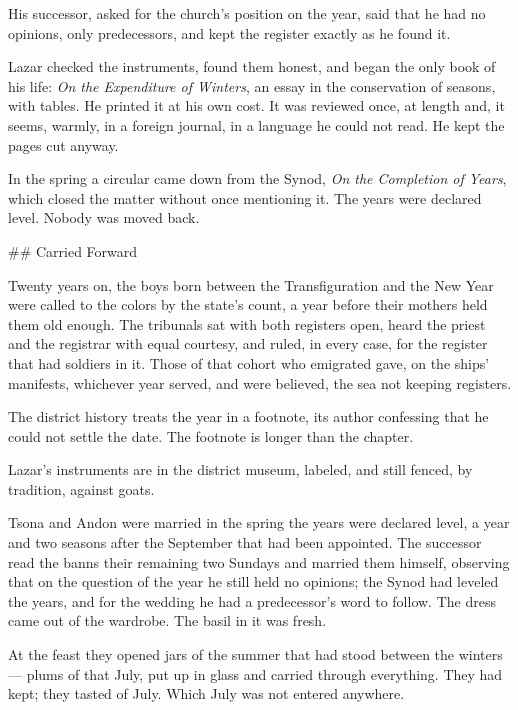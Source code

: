 \documentclass[11pt]{article}
\begin{document}
His successor, asked for the church's position on the year, said that he had no opinions, only predecessors, and kept the register exactly as he found it.

Lazar checked the instruments, found them honest, and began the only book of his life: \emph{On the Expenditure of Winters}, an essay in the conservation of seasons, with tables. He printed it at his own cost. It was reviewed once, at length and, it seems, warmly, in a foreign journal, in a language he could not read. He kept the pages cut anyway.

In the spring a circular came down from the Synod, \emph{On the Completion of Years}, which closed the matter without once mentioning it. The years were declared level. Nobody was moved back.

\#\# Carried Forward

Twenty years on, the boys born between the Transfiguration and the New Year were called to the colors by the state's count, a year before their mothers held them old enough. The tribunals sat with both registers open, heard the priest and the registrar with equal courtesy, and ruled, in every case, for the register that had soldiers in it. Those of that cohort who emigrated gave, on the ships' manifests, whichever year served, and were believed, the sea not keeping registers.

The district history treats the year in a footnote, its author confessing that he could not settle the date. The footnote is longer than the chapter.

Lazar's instruments are in the district museum, labeled, and still fenced, by tradition, against goats.

Tsona and Andon were married in the spring the years were declared level, a year and two seasons after the September that had been appointed. The successor read the banns their remaining two Sundays and married them himself, observing that on the question of the year he still held no opinions; the Synod had leveled the years, and for the wedding he had a predecessor's word to follow. The dress came out of the wardrobe. The basil in it was fresh.

At the feast they opened jars of the summer that had stood between the winters — plums of that July, put up in glass and carried through everything. They had kept; they tasted of July. Which July was not entered anywhere.
\end{document}
